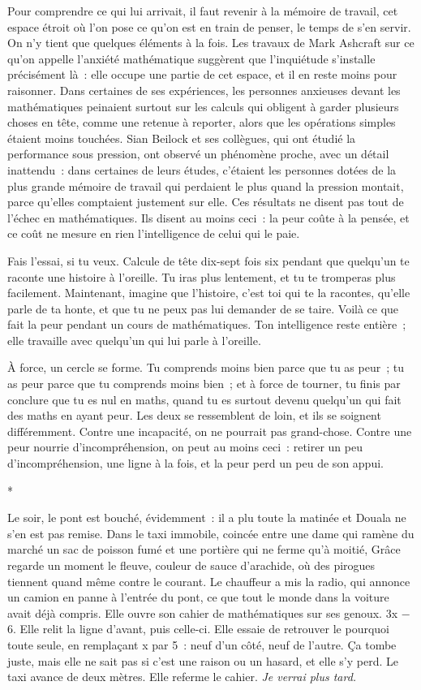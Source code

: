 \documentclass[10.5pt,twoside,openright]{book}
\newcommand{\asterisme}{\par\vspace{0.7em}\centerline{\color{gris}*\quad*\quad*}\vspace{0.7em}\par\noindent}
\begin{document}
Pour comprendre ce qui lui arrivait, il faut revenir à la mémoire de travail, cet espace étroit où l’on pose ce qu’on est en train de penser, le temps de s’en servir. On n’y tient que quelques éléments à la fois. Les travaux de Mark Ashcraft sur ce qu’on appelle l’anxiété mathématique suggèrent que l’inquiétude s’installe précisément là : elle occupe une partie de cet espace, et il en reste moins pour raisonner. Dans certaines de ses expériences, les personnes anxieuses devant les mathématiques peinaient surtout sur les calculs qui obligent à garder plusieurs choses en tête, comme une retenue à reporter, alors que les opérations simples étaient moins touchées. Sian Beilock et ses collègues, qui ont étudié la performance sous pression, ont observé un phénomène proche, avec un détail inattendu : dans certaines de leurs études, c’étaient les personnes dotées de la plus grande mémoire de travail qui perdaient le plus quand la pression montait, parce qu’elles comptaient justement sur elle. Ces résultats ne disent pas tout de l’échec en mathématiques. Ils disent au moins ceci : la peur coûte à la pensée, et ce coût ne mesure en rien l’intelligence de celui qui le paie.

Fais l’essai, si tu veux. Calcule de tête dix-sept fois six pendant que quelqu’un te raconte une histoire à l’oreille. Tu iras plus lentement, et tu te tromperas plus facilement. Maintenant, imagine que l’histoire, c’est toi qui te la racontes, qu’elle parle de ta honte, et que tu ne peux pas lui demander de se taire. Voilà ce que fait la peur pendant un cours de mathématiques. Ton intelligence reste entière ; elle travaille avec quelqu’un qui lui parle à l’oreille.

À force, un cercle se forme. Tu comprends moins bien parce que tu as peur ; tu as peur parce que tu comprends moins bien ; et à force de tourner, tu finis par conclure que tu es nul en maths, quand tu es surtout devenu quelqu’un qui fait des maths en ayant peur. Les deux se ressemblent de loin, et ils se soignent différemment. Contre une incapacité, on ne pourrait pas grand-chose. Contre une peur nourrie d’incompréhension, on peut au moins ceci : retirer un peu d’incompréhension, une ligne à la fois, et la peur perd un peu de son appui.

\asterisme

Le soir, le pont est bouché, évidemment : il a plu toute la matinée et Douala ne s’en est pas remise. Dans le taxi immobile, coincée entre une dame qui ramène du marché un sac de poisson fumé et une portière qui ne ferme qu’à moitié, Grâce regarde un moment le fleuve, couleur de sauce d’arachide, où des pirogues tiennent quand même contre le courant. Le chauffeur a mis la radio, qui annonce un camion en panne à l’entrée du pont, ce que tout le monde dans la voiture avait déjà compris. Elle ouvre son cahier de mathématiques sur ses genoux. 3x − 6. Elle relit la ligne d’avant, puis celle-ci. Elle essaie de retrouver le pourquoi toute seule, en remplaçant x par 5 : neuf d’un côté, neuf de l’autre. Ça tombe juste, mais elle ne sait pas si c’est une raison ou un hasard, et elle s’y perd. Le taxi avance de deux mètres. Elle referme le cahier. \emph{Je verrai plus tard.}
\end{document}
